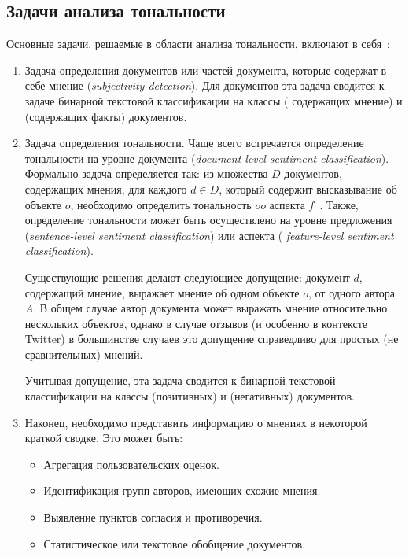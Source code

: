 \subsection{Задачи анализа тональности}

Основные задачи, решаемые в области анализа тональности, 
включают в себя~\cite{panglee}:
\begin{enumerate}


\item {
  Задача определения документов или частей документа, которые содержат в себе 
  мнение (\textit{subjectivity detection}). Для документов эта задача сводится к 
  задаче бинарной текстовой классификации на классы {} (
  содержащих мнение) и {} (содержащих факты) документов.
}

\item {
  Задача определения тональности. Чаще всего встречается определение 
  тональности на уровне документа (\textit{document-level sentiment classification}). 
  Формально задача определяется так: 
  из множества $D$ документов, содержащих мнения, для каждого $d \in D$, 
  который содержит высказывание об объекте $o$, необходимо определить 
  тональность $oo$ аспекта $f$~\cite{sentsubj}. 
  Также, определение тональности может быть осуществлено на уровне 
  предложения (\textit{sentence-level sentiment classification}) или аспекта (\textit{
  feature-level sentiment classification}).

  Существующие решения делают следующиее допущение: документ $d$, 
  содержащий мнение, выражает мнение об одном объекте $o$, 
  от одного автора $A$. В общем случае автор документа может выражать мнение 
  относительно нескольких объектов, однако в случае отзывов (и особенно в 
  контексте Twitter) в большинстве случаев это допущение справедливо для 
  простых (не сравнительных) мнений.

  Учитывая допущение, эта задача сводится к бинарной текстовой классификации 
  на классы {} (позитивных) и {} (негативных) 
  документов.
}

\item {
  Наконец, необходимо представить информацию о мнениях в некоторой краткой 
  сводке. Это может быть:
  
  \begin{itemize}

  \item Агрегация пользовательских оценок.
  \item Идентификация групп авторов, имеющих схожие мнения.
  \item Выявление пунктов согласия и противоречия.
  \item Статистическое или текстовое обобщение документов.

  \end{itemize}
}

\end{enumerate}

